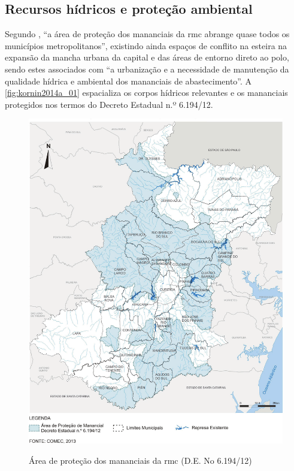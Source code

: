 	\subsection{Recursos hídricos e proteção ambiental}
	
	Segundo , ``a área de proteção dos mananciais da \gls{rmc} abrange quase todos os municípios metropolitanos'', existindo ainda espaços de conflito na esteira na expansão da mancha urbana da capital e das áreas de entorno direto ao polo, sendo estes associados com ``a urbanização e a necessidade de manutenção da qualidade hídrica e ambiental dos mananciais de abastecimento''. A \autoref{fig:kornin2014a_01} espacializa os corpos hídricos relevantes e os mananciais protegidos nos termos do Decreto Estadual n.º 6.194/12.
	
	\begin{figure}
		\centering
		\caption{Área de proteção dos mananciais da \gls{rmc} (D.E. No 6.194/12)}
		\includegraphics[width=1.0\linewidth]{img/kornin2014a_01}
		\label{fig:kornin2014a_01}
	\end{figure}

